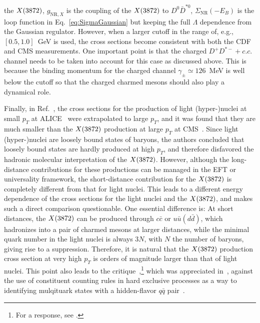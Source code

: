 the $X(3872)$, $g_{\text{NR},X}^{}$ is the coupling of the $X(3872)$ to $D^0\bar D^{*0}$,
$\Sigma_\text{NR}(-E_B)$ is the loop function in Eq.~\eqref{eq:SigmaGaussian}
but keeping the full $\Lambda$ dependence from the Gaussian regulator. However,
when a larger cutoff in the range of, e.g., $[0.5,1.0]$~GeV is used, the cross
sections become consistent with both the CDF and CMS measurements. One
important point is that the charged $D^+D^{*-}+c.c.$ channel needs to be taken
into account for this case as discussed above. This is because the binding
momentum for the charged
channel $\gamma_\pm\simeq126$~MeV is well below the cutoff so that the charged
charmed mesons should also play a dynamical role.





Finally, in Ref.~\cite{Esposito:2015fsa}, the cross sections for the production
of light (hyper-)nuclei at small $p_T$ at ALICE~\cite{Adam:2015vda} were
extrapolated to large $p_T$, and it was found that they are much smaller than
the $X(3872)$ production at large $p_T$ at CMS~\cite{Chatrchyan:2013cld}.
Since light (hyper-)nuclei are loosely bound states of baryons, the authors
concluded that loosely bound states are hardly produced at high $p_T$, and
therefore disfavored the hadronic molecular interpretation of the $X(3872)$.
However, although the long-distance contributions for these productions can be
managed in the EFT or universality framework, the short-distance contribution
for the $X(3872)$ is completely different from that for light nuclei. This leads to a
different energy dependence of the cross sections for the light nuclei and the
$X(3872)$, and makes such a direct comparison questionable.
One essential difference is: At short distances, the $X(3872)$ can be produced
through $c\bar c$ or $u\bar u (d\bar d)$, which hadronizes into a pair of
charmed mesons at larger distances, while the minimal quark number in the light
nuclei is always $3N$, with $N$ the number of baryons, giving rise to a
suppression.
Therefore, it is natural that the $X(3872)$ production cross section at very high
$p_T$ is orders of magnitude larger than that of light nuclei. This point also
leads to the critique~\cite{Guo:2016fqg},\footnote{For a response, see
\cite{Brodsky:2016uln}.} which was appreciated in~\cite{Voloshin:2016phx},
against the use of constituent counting rules in hard exclusive processes as a way to identifying mulqituark states with a
hidden-flavor $q\bar q$
pair~\cite{Kawamura:2013iia,Kawamura:2013wfa,Brodsky:2015wza,Chang:2015ioc}.


